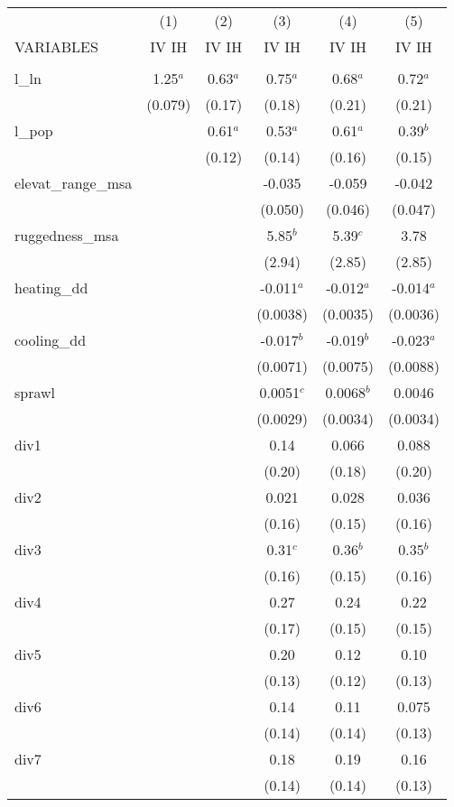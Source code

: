 \documentclass[]{article}
\begin{document}
\begin{tabular}{lccccc} \hline
 & (1) & (2) & (3) & (4) & (5) \\
VARIABLES & IV IH & IV IH & IV IH & IV IH & IV IH \\ \hline
 &  &  &  &  &  \\
l\_ln & 1.25$^a$ & 0.63$^a$ & 0.75$^a$ & 0.68$^a$ & 0.72$^a$ \\
 & (0.079) & (0.17) & (0.18) & (0.21) & (0.21) \\
l\_pop &  & 0.61$^a$ & 0.53$^a$ & 0.61$^a$ & 0.39$^b$ \\
 &  & (0.12) & (0.14) & (0.16) & (0.15) \\
elevat\_range\_msa &  &  & -0.035 & -0.059 & -0.042 \\
 &  &  & (0.050) & (0.046) & (0.047) \\
ruggedness\_msa &  &  & 5.85$^b$ & 5.39$^c$ & 3.78 \\
 &  &  & (2.94) & (2.85) & (2.85) \\
heating\_dd &  &  & -0.011$^a$ & -0.012$^a$ & -0.014$^a$ \\
 &  &  & (0.0038) & (0.0035) & (0.0036) \\
cooling\_dd &  &  & -0.017$^b$ & -0.019$^b$ & -0.023$^a$ \\
 &  &  & (0.0071) & (0.0075) & (0.0088) \\
sprawl &  &  & 0.0051$^c$ & 0.0068$^b$ & 0.0046 \\
 &  &  & (0.0029) & (0.0034) & (0.0034) \\
div1 &  &  & 0.14 & 0.066 & 0.088 \\
 &  &  & (0.20) & (0.18) & (0.20) \\
div2 &  &  & 0.021 & 0.028 & 0.036 \\
 &  &  & (0.16) & (0.15) & (0.16) \\
div3 &  &  & 0.31$^c$ & 0.36$^b$ & 0.35$^b$ \\
 &  &  & (0.16) & (0.15) & (0.16) \\
div4 &  &  & 0.27 & 0.24 & 0.22 \\
 &  &  & (0.17) & (0.15) & (0.15) \\
div5 &  &  & 0.20 & 0.12 & 0.10 \\
 &  &  & (0.13) & (0.12) & (0.13) \\
div6 &  &  & 0.14 & 0.11 & 0.075 \\
 &  &  & (0.14) & (0.14) & (0.13) \\
div7 &  &  & 0.18 & 0.19 & 0.16 \\
 &  &  & (0.14) & (0.14) & (0.13) \\

\end{tabular}
\end{document}
